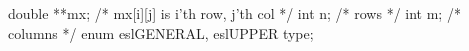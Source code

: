 \begin{cchunk}
  double **mx;                  /* mx[i][j] is i'th row, j'th col */
  int      n;                   /* rows    */
  int      m;                   /* columns */
  enum { eslGENERAL, eslUPPER } type;
\end{cchunk}
